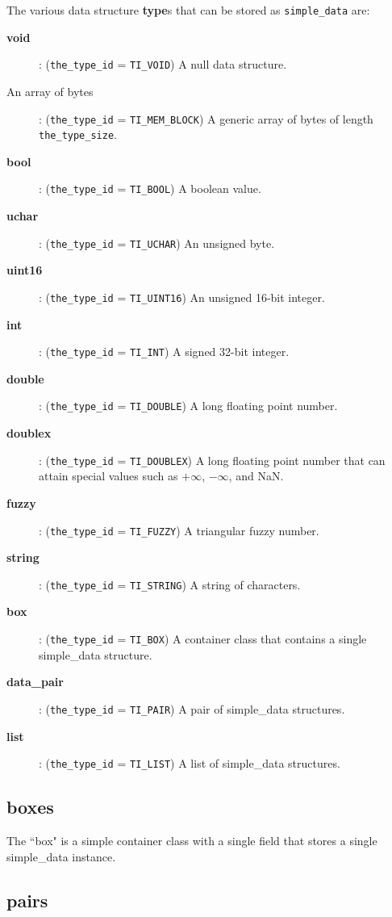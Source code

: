 \documentclass{article}
\begin{document}
The various data structure \textbf{type}s that can be stored as \texttt{simple\_data} are:
\begin{description}
\item[\textbf{void}]: (\texttt{the\_type\_id} = \texttt{TI\_VOID}) A null data structure.
\item[An array of bytes]: (\texttt{the\_type\_id} = \texttt{TI\_MEM\_BLOCK}) A generic array of bytes of length \texttt{the\_type\_size}. 
\item[\textbf{bool}]: (\texttt{the\_type\_id} = \texttt{TI\_BOOL}) A boolean value.
\item[\textbf{uchar}]: (\texttt{the\_type\_id} = \texttt{TI\_UCHAR}) An unsigned byte.
\item[\textbf{uint16}]: (\texttt{the\_type\_id} = \texttt{TI\_UINT16}) An unsigned 16-bit integer.
\item[\textbf{int}]: (\texttt{the\_type\_id} = \texttt{TI\_INT}) A signed 32-bit integer.
\item[\textbf{double}]: (\texttt{the\_type\_id} = \texttt{TI\_DOUBLE}) A long floating point number.
\item[\textbf{doublex}]: (\texttt{the\_type\_id} = \texttt{TI\_DOUBLEX}) A long floating point number that can attain special values such as \(+\infty\), \(-\infty\), and NaN.
\item[\textbf{fuzzy}]: (\texttt{the\_type\_id} = \texttt{TI\_FUZZY}) A triangular fuzzy number.
\item[\textbf{string}]: (\texttt{the\_type\_id} = \texttt{TI\_STRING}) A string of characters.
\item[\textbf{box}]: (\texttt{the\_type\_id} = \texttt{TI\_BOX}) A container class that contains a single simple\_data structure.
\item[\textbf{data\_pair}]: (\texttt{the\_type\_id} = \texttt{TI\_PAIR}) A pair of simple\_data structures.
\item[\textbf{list}]: (\texttt{the\_type\_id} = \texttt{TI\_LIST}) A list of simple\_data structures.
\end{description}


\subsection{boxes}

The ``box" is a simple container class with a single field that stores a single simple\_data instance. 

\subsection{pairs}
\end{document}
